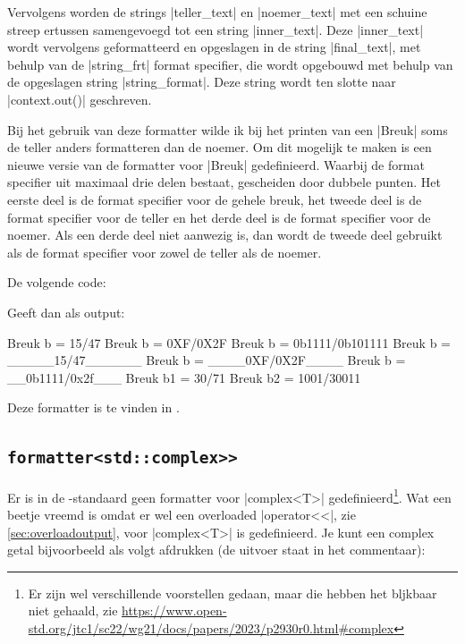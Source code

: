 \begin{cpplstShortInline}
Vervolgens worden de strings |teller_text| en |noemer_text| met een schuine streep ertussen samengevoegd tot een string |inner_text|.
Deze |inner_text| wordt vervolgens geformatteerd en opgeslagen in de string |final_text|, met behulp van de |string_frt| format specifier, die wordt opgebouwd met behulp van de opgeslagen string |string_format|.
Deze string wordt ten slotte naar |context.out()| geschreven.

Bij het gebruik van deze formatter wilde ik bij het printen van een |Breuk| soms de teller anders formatteren dan de noemer.
Om dit mogelijk te maken is een nieuwe versie van de formatter voor |Breuk| gedefinieerd.
Waarbij de format specifier uit maximaal drie delen bestaat, gescheiden door dubbele punten.
Het eerste deel is de format specifier voor de gehele breuk, het tweede deel is de format specifier voor de teller en het derde deel is de format specifier voor de noemer.
Als een derde deel niet aanwezig is, dan wordt de tweede deel gebruikt als de format specifier voor zowel de teller als de noemer.

De volgende code:

Geeft dan als output:
\begin{coutput}
Breuk b = 15/47
Breuk b = 0XF/0X2F
Breuk b = 0b1111/0b101111
Breuk b = _____15/47______
Breuk b = ____0XF/0X2F____
Breuk b = __0b1111/0x2f___
Breuk b1 =         30/71
Breuk b2 =       1001/30011
\end{coutput}

Deze formatter is te vinden in .

\subsection[\texttt{formatter<std::complex>{}>}]{\texorpdfstring{\texttt{formatter<std::complex>{}>}}{formatter<std::complex>>}}
Er is in de \Cpp{}-standaard geen formatter voor |complex<T>| gedefinieerd\footnote{%
	Er zijn wel verschillende voorstellen gedaan, maar die hebben het bljkbaar niet gehaald, zie \url{https://www.open-std.org/jtc1/sc22/wg21/docs/papers/2023/p2930r0.html\#complex}
}.
Wat een beetje vreemd is omdat er wel een overloaded |operator<<|, zie \cref{sec:overloadoutput}, voor |complex<T>| is gedefinieerd.
Je kunt een complex getal bijvoorbeeld als volgt afdrukken (de uitvoer staat in het commentaar):


\end{cpplstShortInline}
